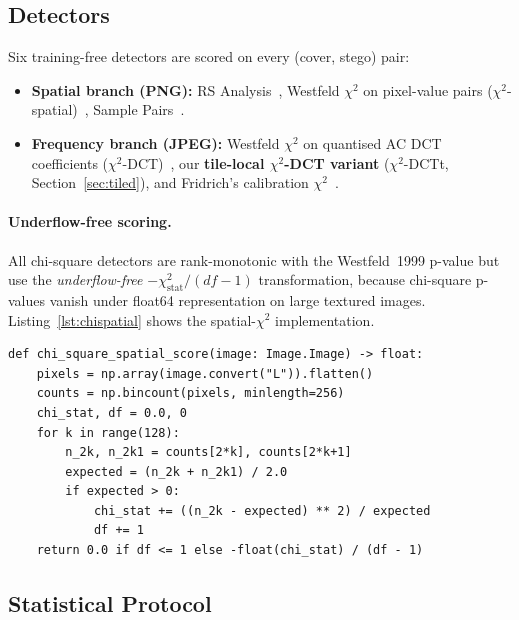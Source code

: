 \documentclass[10pt,twocolumn,a4paper]{article}
\begin{document}
\subsection{Detectors}
\label{sec:detectors}

Six training-free detectors are scored on every (cover, stego) pair:
\begin{itemize}
\item \textbf{Spatial branch (PNG):} RS Analysis~\cite{fridrich2001lsb}, Westfeld $\chi^2$ on pixel-value pairs ($\chi^2$-spatial)~\cite{westfeld1999chi}, Sample Pairs~\cite{dumitrescu2003sp}.
\item \textbf{Frequency branch (JPEG):} Westfeld $\chi^2$ on quantised AC DCT coefficients ($\chi^2$-DCT)~\cite{westfeld1999chi}, our \textbf{tile-local $\chi^2$-DCT variant} ($\chi^2$-DCTt, Section~\ref{sec:tiled}), and Fridrich's calibration $\chi^2$~\cite{fridrich2003calib}.
\end{itemize}

\paragraph{Underflow-free scoring.} All chi-square detectors are rank-monotonic with the Westfeld~1999 p-value but use the \emph{underflow-free} $-\chi^2_\text{stat}/(df\!-\!1)$ transformation, because chi-square p-values vanish under float64 representation on large textured images. Listing~\ref{lst:chispatial} shows the spatial-$\chi^2$ implementation.

\begin{lstlisting}[label={lst:chispatial},caption={Spatial $\chi^2$ (Westfeld~1999) on a grayscale image, with the underflow-free score transformation. The classical p-value is replaced by $-\chi^2/df$ which is rank-monotonic with the p-value on non-degenerate inputs but does not collapse to zero on large textured images.}]
def chi_square_spatial_score(image: Image.Image) -> float:
    pixels = np.array(image.convert("L")).flatten()
    counts = np.bincount(pixels, minlength=256)
    chi_stat, df = 0.0, 0
    for k in range(128):
        n_2k, n_2k1 = counts[2*k], counts[2*k+1]
        expected = (n_2k + n_2k1) / 2.0
        if expected > 0:
            chi_stat += ((n_2k - expected) ** 2) / expected
            df += 1
    return 0.0 if df <= 1 else -float(chi_stat) / (df - 1)
\end{lstlisting}

\subsection{Statistical Protocol}
\label{sec:stats}
\end{document}
